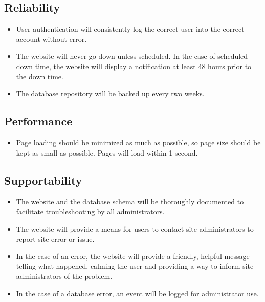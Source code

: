 	\subsection{Reliability}
	\begin{itemize}
		\item User authentication will consistently log the correct user into the correct account without error.
		\item The website will never go down unless scheduled. In the case of scheduled down time, the website will display a notification at least 48 hours prior to the down time.
		\item The database repository will be backed up every two weeks.
	\end{itemize}
	
	\subsection{Performance}
	\begin{itemize}
		\item Page loading should be minimized as much as possible, so page size should be kept as small as possible. Pages will load within 1 second.
	\end{itemize}
	
	\subsection{Supportability}
	\begin{itemize}
		\item The website and the database schema will be thoroughly documented to facilitate troubleshooting by all administrators.
		\item The website will provide a means for users to contact site administrators to report site error or issue.
		\item In the case of an error, the website will provide a friendly, helpful message telling what happened, calming the user and providing a way to inform site administrators of the problem.
		\item In the case of a database error, an event will be logged for administrator use.
	\end{itemize}

\newpage